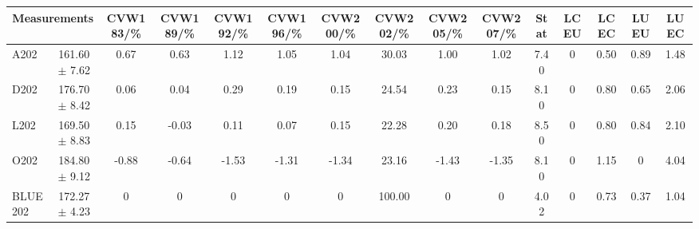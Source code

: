 \begin{table}[H]
\scriptsize
\begin{center}
\renewcommand{\arraystretch}{1.1}
\begin{tabular}{|lc|c|c|c|c|c|c|c|c|ccccc|}
\hline
\multicolumn{2}{|c|}{Measurements} & CVW{\tiny 183}/\%  & CVW{\tiny 189}/\%  & CVW{\tiny 192}/\%  & CVW{\tiny 196}/\%  & CVW{\tiny 200}/\%  & CVW{\tiny 202}/\%  & CVW{\tiny 205}/\%  & CVW{\tiny 207}/\%  & {\tiny Stat} & {\tiny LCEU} & {\tiny LCEC} & {\tiny LUEU} & {\tiny LUEC}\\
\hline
A202 &     161.60 $\pm$       7.62 &       0.67 &       0.63 &       1.12 &       1.05 &       1.04 &      30.03 &       1.00 &       1.02 &       7.40 &  0 &       0.50 &       0.89 &       1.48\\
D202 &     176.70 $\pm$       8.42 &       0.06 &       0.04 &       0.29 &       0.19 &       0.15 &      24.54 &       0.23 &       0.15 &       8.10 &  0 &       0.80 &       0.65 &       2.06\\
L202 &     169.50 $\pm$       8.83 &       0.15 &      -0.03 &       0.11 &       0.07 &       0.15 &      22.28 &       0.20 &       0.18 &       8.50 &  0 &       0.80 &       0.84 &       2.10\\
O202 &     184.80 $\pm$       9.12 &      -0.88 &      -0.64 &      -1.53 &      -1.31 &      -1.34 &      23.16 &      -1.43 &      -1.35 &       8.10 &  0 &       1.15 &  0 &       4.04\\
\hline
BLUE {\tiny 202} &     172.27 $\pm$       4.23 &  0 &  0 &  0 &  0 &  0 &     100.00 &  0 &  0 &       4.02 &  0 &       0.73 &       0.37 &       1.04\\
\hline
\end{tabular}
\renewcommand{\arraystretch}{1}
\end{center}
\end{table}
\vspace*{-0.5cm}
